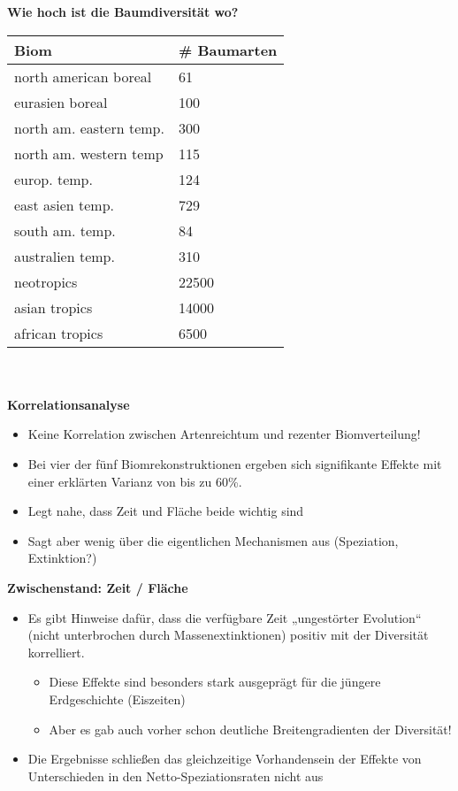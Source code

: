 \textbf{Wie hoch ist die Baumdiversität wo?}\\
\begin{tabularx}{0.5\textwidth}{p{}|p{}}
Biom & \# Baumarten\\
\hline
north american boreal & 61 \\
eurasien boreal & 100 \\
north am. eastern temp. & 300 \\
north am. western temp & 115 \\
europ. temp. & 124 \\
east asien temp. & 729 \\
south am. temp. & 84 \\
australien temp. & 310 \\
neotropics & 22500 \\
asian tropics & 14000 \\
african tropics & 6500 \\
\end{tabularx}
\\\\
\textbf{Korrelationsanalyse}
\begin{itemize}
	\item Keine Korrelation zwischen Artenreichtum und rezenter Biomverteilung!
	\item Bei vier der fünf Biomrekonstruktionen ergeben sich signifikante Effekte mit einer erklärten Varianz von bis zu 60\%.
	\item Legt nahe, dass Zeit und Fläche beide wichtig sind
	\item Sagt aber wenig über die eigentlichen Mechanismen aus (Speziation, Extinktion?)
\end{itemize}

\textbf{Zwischenstand: Zeit / Fläche}
\begin{itemize}
	\item Es gibt Hinweise dafür, dass die verfügbare Zeit „ungestörter Evolution“ (nicht unterbrochen durch Massenextinktionen) positiv mit der Diversität korrelliert.
	\begin{itemize}
		\item Diese Effekte sind besonders stark ausgeprägt für die jüngere Erdgeschichte (Eiszeiten)
		\item Aber es gab auch vorher schon deutliche Breitengradienten der Diversität!
	\end{itemize}
	\item Die Ergebnisse schließen das gleichzeitige Vorhandensein der Effekte von Unterschieden in den Netto-Speziationsraten nicht aus
\end{itemize}

